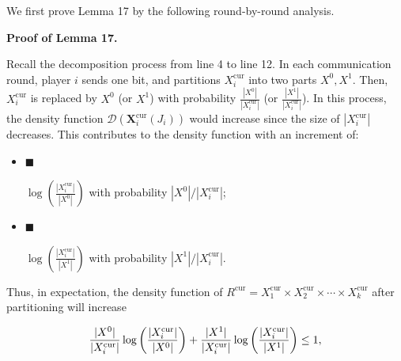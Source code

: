 We first prove Lemma 17 by the following round-by-round analysis.\par




\par\medskip\noindent\textbf{Proof of Lemma 17.}\par




Recall the decomposition process from line 4 to line 12. In each communication round, player $i$ sends one bit, and partitions $X_{i}^{\text{cur}}$ into two parts $X^{0},X^{1}$. Then, $X_{i}^{\text{cur}}$ is replaced by $X^{0}$ (or $X^{1}$) with probability $\frac{|X^{0}|}{|X_{i}^{\text{cur}}|}$ (or $\frac{|X^{1}|}{|X_{i}^{\text{cur}}|}$). In this process, the density function $\mathcal{D}(\bm{X}_{i}^{\text{cur}}(J_{i}))$ would increase since the size of $|X_{i}^{\text{cur}}|$ decreases. This contributes to the density function with an increment of:\par


\begin{itemize}


\item[] 
$\blacksquare$ 


$\log(\frac{|X_{i}^{\text{cur}}|}{|X^{0}|})$ with probability $|X^{0}|/|X_{i}^{\text{cur}}|$;\par





\item[] 
$\blacksquare$ 


$\log(\frac{|X_{i}^{\text{cur}}|}{|X^{1}|})$ with probability $|X^{1}|/|X_{i}^{\text{cur}}|$.\par





\end{itemize}


Thus, in expectation, the density function of $R^{\text{cur}}=X_{1}^{\text{cur}}\times X_{2}^{\text{cur}}\times\cdots\times X_{k}^{\text{cur}}$ after partitioning will increase\par


\[\begin{gathered}
\frac{|X^{0}|}{|X_{i}^{\text{cur}}|}\log\bigg{(}\frac{|X_{i}^{\text{cur}}|}{|X^{0}|}\bigg{)}+\frac{|X^{1}|}{|X_{i}^{\text{cur}}|}\log\bigg{(}\frac{|X_{i}^{\text{cur}}|}{|X^{1}|}\bigg{)}\leq 1,
\end{gathered}\]


